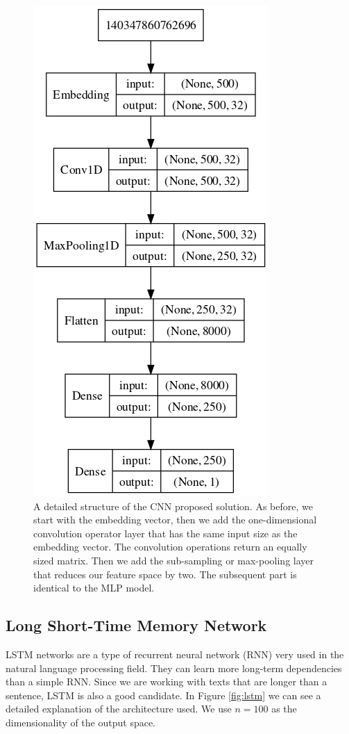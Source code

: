 \documentclass[conference]{IEEEtran}
\theoremstyle{plain}
\theoremstyle{definition}
\theoremstyle{remark}
\begin{document}
\begin{figure}[tbh!]
	\centering
	\includegraphics[width=.4\linewidth]{model_CNN.png}
	\caption[bla.]{A detailed structure of the CNN proposed solution. As before, we start with the embedding vector, then we add the one-dimensional convolution operator layer that has the same input size as the embedding vector. The convolution operations return an equally sized matrix. Then we add the sub-sampling or max-pooling layer that reduces our feature space by two. The subsequent part is identical to the MLP model.}
	\label{fig:cnn}
\end{figure}

\subsection{Long Short-Time Memory Network}
LSTM networks are a type of recurrent neural network (RNN) very used in the natural language processing field. They can learn more long-term dependencies than a simple RNN. Since we are working with texts that are longer than a sentence, LSTM is also a good candidate. In Figure \ref{fig:lstm} we can see a detailed explanation of the architecture used. We use $n=100$ as the dimensionality of the output space. \\
\end{document}
